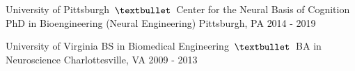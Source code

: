 \vspace*{0.20cm}

\begin{cventries}
\vspace*{0.20cm}
  \cventry
    {University of Pittsburgh $\,\textbullet\,$ Center for the Neural Basis of Cognition} %
    {PhD in Bioengineering (Neural Engineering)} %
    {Pittsburgh, PA} %
    {2014 - 2019} %
    {
    }
    \vspace*{-0.2cm}
    
  \cventry
    {University of Virginia} %
    {BS in Biomedical Engineering $\,\textbullet\,$ BA in Neuroscience} %
    {Charlottesville, VA} %
    {2009 - 2013} %
    {
    }
    \vspace*{-0.6cm}

\end{cventries}
